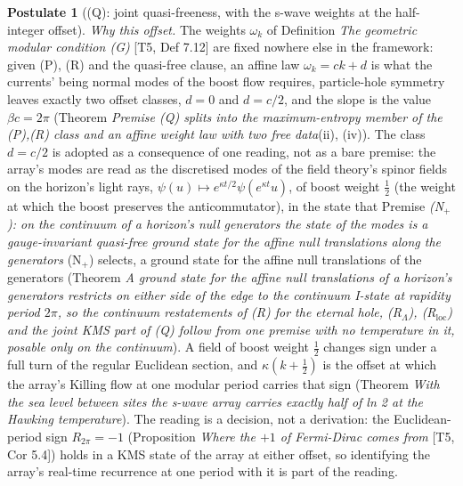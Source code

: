 \documentclass[11pt]{article}
\theoremstyle{definition}
\newtheorem{postulate}[theorem]{Postulate}
\theoremstyle{plain}
\begin{document}
\begin{postulate}[(Q): joint quasi-freeness, with the s-wave weights at the half-integer offset]
\emph{Why this offset.} The weights $\omega_k$ of Definition \emph{The geometric modular condition (G)} [T5, Def 7.12] are fixed nowhere else in the framework: given (P), (R) and the quasi-free clause, an affine law $\omega_k = ck + d$ is what the currents' being normal modes of the boost flow requires, particle-hole symmetry leaves exactly two offset classes, $d = 0$ and $d = c/2$, and the slope is the value $\beta c = 2\pi$ (Theorem \emph{Premise (Q) splits into the maximum-entropy member of the (P),(R) class and an affine weight law with two free data}(ii), (iv)). The class $d = c/2$ is adopted as a consequence of one reading, not as a bare premise: the array's modes are read as the discretised modes of the field theory's spinor fields on the horizon's light rays, $\psi(u) \mapsto e^{\kappa t/2}\psi(e^{\kappa t}u)$, of boost weight $\tfrac12$ (the weight at which the boost preserves the anticommutator), in the state that Premise \emph{(N$_{+}$): on the continuum of a horizon's null generators the state of the modes is a gauge-invariant quasi-free ground state for the affine null translations along the generators} (N$_{+}$) selects, a ground state for the affine null translations of the generators (Theorem \emph{A ground state for the affine null translations of a horizon's generators restricts on either side of the edge to the continuum I-state at rapidity period $2\pi$, so the continuum restatements of (R) for the eternal hole, (R$_{\Lambda}$), (R$_{\mathrm{loc}}$) and the joint KMS part of (Q) follow from one premise with no temperature in it, posable only on the continuum}). A field of boost weight $\tfrac12$ changes sign under a full turn of the regular Euclidean section, and $\kappa(k + \tfrac12)$ is the offset at which the array's Killing flow at one modular period carries that sign (Theorem \emph{With the sea level between sites the s-wave array carries exactly half of ln 2 at the Hawking temperature}). The reading is a decision, not a derivation: the Euclidean-period sign $R_{2\pi} = -1$ (Proposition \emph{Where the $+1$ of Fermi-Dirac comes from} [T5, Cor 5.4]) holds in a KMS state of the array at either offset, so identifying the array's real-time recurrence at one period with it is part of the reading.


\end{postulate}
\end{document}
